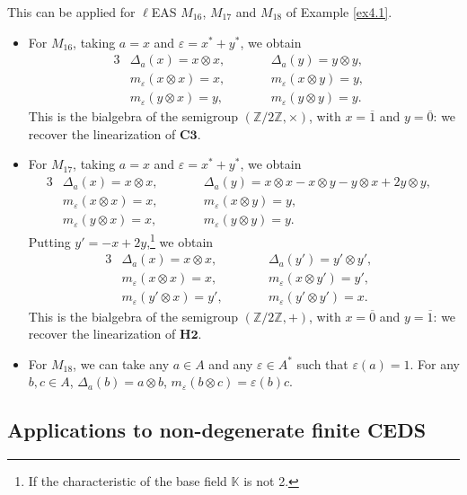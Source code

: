 \documentclass[10pt,a4paper]{amsart}
\numberwithin{equation}{section}
\begin{document}
\begin{Example}
This can be applied for $\ell$EAS $M_{16}$, $M_{17}$ and $M_{18}$ of Example \ref{ex4.1}.
\begin{itemize}
\item For $M_{16}$, taking $a=x$ and $\varepsilon=x^*+y^*$, we obtain
\begin{alignat*}{3}
&\Delta_a(x)=x\otimes x,\qquad&&\Delta_a(y)=y\otimes y,&\\
&m_\varepsilon(x\otimes x)=x,\qquad&& m_\varepsilon(x\otimes y)=y,&\\
&m_\varepsilon(y\otimes x)=y,\qquad&& m_\varepsilon(y\otimes y)=y.&
\end{alignat*}
This is the bialgebra of the semigroup $(\mathbb{Z}/2\mathbb{Z},\times)$, with $x=\overline{1}$ and $y=\overline{0}$:
we recover the linearization of $\mathbf{C3}$.
\item For $M_{17}$, taking $a=x$ and $\varepsilon=x^*+y^*$, we obtain
\begin{alignat*}{3}
&\Delta_a(x)=x\otimes x,\qquad&&\Delta_a(y)=x\otimes x-x\otimes y-y\otimes x+2y\otimes y,&\\
&m_\varepsilon(x\otimes x)=x,\qquad&& m_\varepsilon(x\otimes y)=y,&\\
&m_\varepsilon(y\otimes x)=x,\qquad&& m_\varepsilon(y\otimes y)=y.&
\end{alignat*}
Putting $y'=-x+2y$,\footnote{If the characteristic of the base field $\mathbb{K}$ is not 2.} we obtain
\begin{alignat*}{3}
&\Delta_a(x)=x\otimes x,\qquad&&\Delta_a(y')=y'\otimes y',&\\
&m_\varepsilon(x\otimes x)=x,\qquad&& m_\varepsilon(x\otimes y')=y',&\\
&m_\varepsilon(y'\otimes x)=y',\qquad&& m_\varepsilon(y'\otimes y')=x.&
\end{alignat*}
This is the bialgebra of the semigroup $(\mathbb{Z}/2\mathbb{Z},+)$, with $x=\overline{0}$ and $y=\overline{1}$:
we recover the linearization of $\mathbf{H2}$.
\item For $M_{18}$, we can take any $a\in A$ and any $\varepsilon\in A^*$ such that $\varepsilon(a)=1$. For any $b,c\in A$,
$
\Delta_a(b)=a\otimes b$, $ m_\varepsilon(b\otimes c)=\varepsilon(b)c$.
\end{itemize}\end{Example}


\subsection{Applications to non-degenerate finite CEDS}
\end{document}
